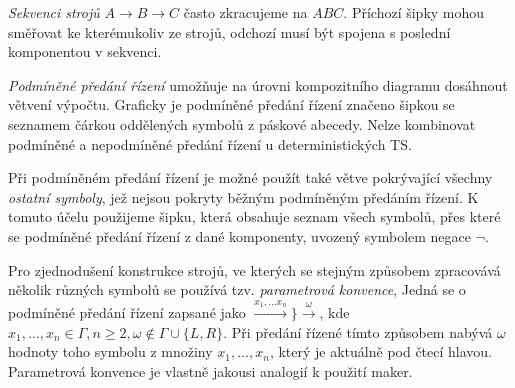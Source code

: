 \documentclass[a4paper, 11pt]{report}
\begin{document}
\emph{Sekvenci strojů} $A \to B \to C$ často zkracujeme na $ABC$. Příchozí šipky mohou směřovat ke kterémukoliv ze strojů, odchozí musí být spojena s poslední komponentou v sekvenci.

\emph{Podmíněné předání řízení} umožňuje na úrovni kompozitního diagramu dosáhnout větvení výpočtu. Graficky je podmíněné předání řízení značeno  šipkou se seznamem čárkou oddělených symbolů z páskové abecedy. Nelze kombinovat podmíněné a nepodmíněné předání řízení u deterministických TS.

Při podmíněném předání řízení je možné použít také větve pokrývající všechny \emph{ostatní symboly}, jež nejsou pokryty běžným podmíněným předáním řízení. K tomuto účelu použijeme šipku, která obsahuje seznam všech symbolů, přes které se podmíněné předání řízení z dané komponenty, uvozený symbolem negace $\neg$.

Pro zjednodušení konstrukce strojů, ve kterých se stejným způsobem zpracovává několik různých symbolů se používá tzv. \emph{parametrová konvence}, Jedná se o podmíněné předání řízení zapsané jako $\xrightarrow{x_1, \dots x_n} \} \xrightarrow{\omega}$, kde $x_1, \dots, x_n \in \Gamma, n \geq 2, \omega \not\in \Gamma \cup \{L, R\}$. Při předání řízené tímto způsobem nabývá $\omega$ hodnoty toho symbolu z množiny $x_1, \dots, x_n$, který je aktuálně pod čtecí hlavou. Parametrová konvence je vlastně jakousi analogií k použití maker.
\end{document}

